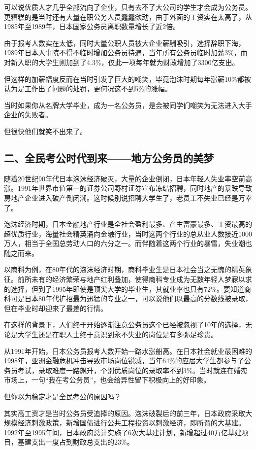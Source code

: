 可以说优质人才几乎全部流向了企业，只有去不了大公司的学生才会成为公务员。更糟糕的是当时还有大量在职公务人员蠢蠢欲动，由于外面的工资实在太高了，从1985年至1989年，日本国家公务员离职数量增长了近2倍。

由于报考人数实在太低，同时大量公职人员被大企业薪酬吸引，选择辞职下海，1989年日本人事院不得不临时增加公务员待遇，当年所有公务员临时加薪3\%，而对新入职的大学生则加到了4.3\%，仅此一项每年就为财政增加了3300亿支出。

但这样的加薪幅度反而在当时引发了巨大的嘲笑，毕竟泡沫时期每年涨薪10\%都被认为是工作出了问题的处罚，更何况这不到5\%的涨幅。

当时如果你从名牌大学毕业，成为一名公务员，是会被同学们嘲笑为无法进入大手企业的失败者。

但很快他们就笑不出来了。

\subsection{二、全民考公时代到来——地方公务员的美梦}

随着20世纪90年代日本泡沫经济破灭，大量的企业倒闭，日本年轻人失业率空前高涨。1991年世界市值第一的证券公司野村证券宣布冻结招聘，同时地产的暴跌导致房地产企业进入破产倒闭潮。这时候别说招聘大学生了，老员工不失业已经是万幸了。

泡沫经济时期，日本金融地产行业是全社会盈利最多、产生富豪最多、工资最高的超优质行业，海量社会精英涌向金融行业，当时这两个行业的总从业人数接近1000万人，相当于全国总劳动人口的六分之一。而伴随着这两个行业的暴雷，失业潮也随之而来。

以商科为例，在80年代的泡沫经济时期，商科毕业生是日本社会当之无愧的精英象征。前所未有的经济繁荣与地产红利叠加，使得商科专业成为无数年轻人梦寐以求的选择，但到了1995年即使是顶尖大学的毕业生，其就业率也只有72\%。要知道商科可是日本80年代扩招最为迅猛的专业之一，可以说他们以最高的分数线被录取，但在毕业时却迎来了最差的行情。

在这样的背景下，人们终于开始逐渐注意公务员这个已经被忽视了10年的选择，无论是大学生还是在职人士终于意识到永不失业的岗位是有多弥足珍贵。

从1991年开始，日本公务员报考人数开始一路水涨船高。在日本社会就业最困难的1998年，亚洲金融危机冲击导致市场岗位锐减，当年64\%的应届大学生都参与了公务员考试，录取难度一路飙升，个别优质岗位的录取率不到3\%。当时就连在婚恋市场上，一句“我在考公务员”，也会给异性留下积极向上的好印象。

但你以为稳定才是全民考公的原因吗？

其实高工资才是当时公务员受追捧的原因。泡沫破裂后的前三年，日本政府采取大规模经济刺激政策，新增国债进行公共工程投资以刺激经济，即所谓的大基建。1992年至1995年间，日本政府总计实施了6次大基建计划，新增超过40万亿基建项目，基建支出一度占到财政总支出的23\%。


